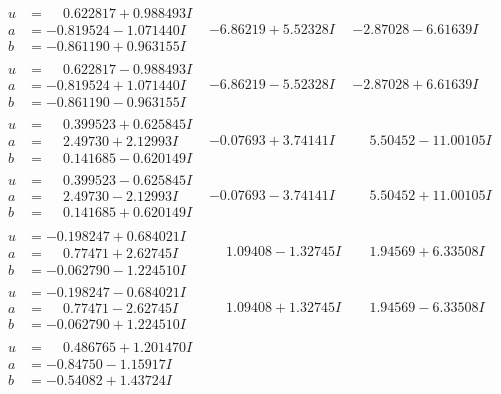 \documentclass[1p]{elsarticle_modified}
\theoremstyle{definition}
\begin{document}
$$\begin{array}{c|c|c}
\begin{aligned}
u &= \phantom{-}0.622817 + 0.988493 I \\
a &= -0.819524 - 1.071440 I \\
b &= -0.861190 + 0.963155 I\end{aligned}
 & -6.86219 + 5.52328 I & -2.87028 - 6.61639 I \\ \hline\begin{aligned}
u &= \phantom{-}0.622817 - 0.988493 I \\
a &= -0.819524 + 1.071440 I \\
b &= -0.861190 - 0.963155 I\end{aligned}
 & -6.86219 - 5.52328 I & -2.87028 + 6.61639 I \\ \hline\begin{aligned}
u &= \phantom{-}0.399523 + 0.625845 I \\
a &= \phantom{-}2.49730 + 2.12993 I \\
b &= \phantom{-}0.141685 - 0.620149 I\end{aligned}
 & -0.07693 + 3.74141 I & \phantom{-}5.50452 - 11.00105 I \\ \hline\begin{aligned}
u &= \phantom{-}0.399523 - 0.625845 I \\
a &= \phantom{-}2.49730 - 2.12993 I \\
b &= \phantom{-}0.141685 + 0.620149 I\end{aligned}
 & -0.07693 - 3.74141 I & \phantom{-}5.50452 + 11.00105 I \\ \hline\begin{aligned}
u &= -0.198247 + 0.684021 I \\
a &= \phantom{-}0.77471 + 2.62745 I \\
b &= -0.062790 - 1.224510 I\end{aligned}
 & \phantom{-}1.09408 - 1.32745 I & \phantom{-}1.94569 + 6.33508 I \\ \hline\begin{aligned}
u &= -0.198247 - 0.684021 I \\
a &= \phantom{-}0.77471 - 2.62745 I \\
b &= -0.062790 + 1.224510 I\end{aligned}
 & \phantom{-}1.09408 + 1.32745 I & \phantom{-}1.94569 - 6.33508 I \\ \hline\begin{aligned}
u &= \phantom{-}0.486765 + 1.201470 I \\
a &= -0.84750 - 1.15917 I \\
b &= -0.54082 + 1.43724 I\end{aligned}

\end{array}$$
\end{document}
